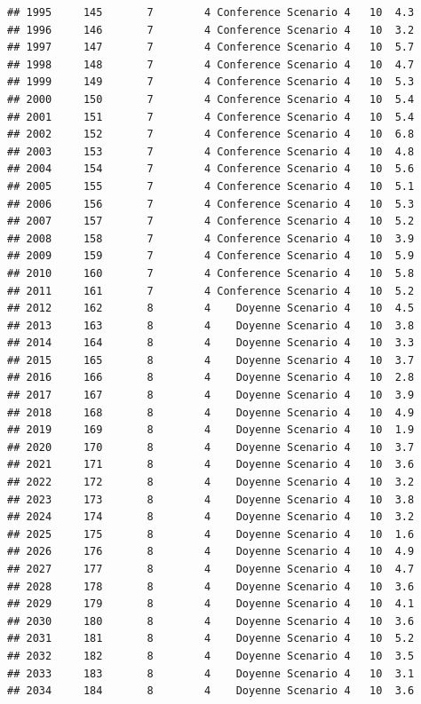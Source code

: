 \documentclass[
]{article}
\begin{document}
\begin{verbatim}
## 1995     145       7        4 Conference Scenario 4   10  4.3
## 1996     146       7        4 Conference Scenario 4   10  3.2
## 1997     147       7        4 Conference Scenario 4   10  5.7
## 1998     148       7        4 Conference Scenario 4   10  4.7
## 1999     149       7        4 Conference Scenario 4   10  5.3
## 2000     150       7        4 Conference Scenario 4   10  5.4
## 2001     151       7        4 Conference Scenario 4   10  5.4
## 2002     152       7        4 Conference Scenario 4   10  6.8
## 2003     153       7        4 Conference Scenario 4   10  4.8
## 2004     154       7        4 Conference Scenario 4   10  5.6
## 2005     155       7        4 Conference Scenario 4   10  5.1
## 2006     156       7        4 Conference Scenario 4   10  5.3
## 2007     157       7        4 Conference Scenario 4   10  5.2
## 2008     158       7        4 Conference Scenario 4   10  3.9
## 2009     159       7        4 Conference Scenario 4   10  5.9
## 2010     160       7        4 Conference Scenario 4   10  5.8
## 2011     161       7        4 Conference Scenario 4   10  5.2
## 2012     162       8        4    Doyenne Scenario 4   10  4.5
## 2013     163       8        4    Doyenne Scenario 4   10  3.8
## 2014     164       8        4    Doyenne Scenario 4   10  3.3
## 2015     165       8        4    Doyenne Scenario 4   10  3.7
## 2016     166       8        4    Doyenne Scenario 4   10  2.8
## 2017     167       8        4    Doyenne Scenario 4   10  3.9
## 2018     168       8        4    Doyenne Scenario 4   10  4.9
## 2019     169       8        4    Doyenne Scenario 4   10  1.9
## 2020     170       8        4    Doyenne Scenario 4   10  3.7
## 2021     171       8        4    Doyenne Scenario 4   10  3.6
## 2022     172       8        4    Doyenne Scenario 4   10  3.2
## 2023     173       8        4    Doyenne Scenario 4   10  3.8
## 2024     174       8        4    Doyenne Scenario 4   10  3.2
## 2025     175       8        4    Doyenne Scenario 4   10  1.6
## 2026     176       8        4    Doyenne Scenario 4   10  4.9
## 2027     177       8        4    Doyenne Scenario 4   10  4.7
## 2028     178       8        4    Doyenne Scenario 4   10  3.6
## 2029     179       8        4    Doyenne Scenario 4   10  4.1
## 2030     180       8        4    Doyenne Scenario 4   10  3.6
## 2031     181       8        4    Doyenne Scenario 4   10  5.2
## 2032     182       8        4    Doyenne Scenario 4   10  3.5
## 2033     183       8        4    Doyenne Scenario 4   10  3.1
## 2034     184       8        4    Doyenne Scenario 4   10  3.6

\end{verbatim}
\end{document}
